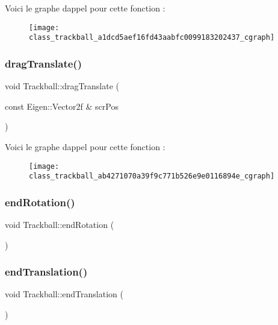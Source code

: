Voici le graphe d\textquotesingle{}appel pour cette fonction \+:\nopagebreak
\begin{figure}[H]
\begin{center}
\leavevmode
\texttt{[image: class\_trackball\_a1dcd5aef16fd43aabfc0099183202437\_cgraph]}
\end{center}
\end{figure}
\mbox{\label{class_trackball_ab4271070a39f9c771b526e9e0116894e}} 
\subsubsection{\texorpdfstring{drag\+Translate()}{dragTranslate()}}
{\footnotesize\ttfamily void Trackball\+::drag\+Translate (\begin{DoxyParamCaption}\item[{const Eigen\+::\+Vector2f \&}]{scr\+Pos }\end{DoxyParamCaption})}

Voici le graphe d\textquotesingle{}appel pour cette fonction \+:\nopagebreak
\begin{figure}[H]
\begin{center}
\leavevmode
\texttt{[image: class\_trackball\_ab4271070a39f9c771b526e9e0116894e\_cgraph]}
\end{center}
\end{figure}
\mbox{\label{class_trackball_a1d2f2f29955059d93bb64fe5f83b0afc}} 
\subsubsection{\texorpdfstring{end\+Rotation()}{endRotation()}}
{\footnotesize\ttfamily void Trackball\+::end\+Rotation (\begin{DoxyParamCaption}{ }\end{DoxyParamCaption})}

\mbox{\label{class_trackball_ae8ba33700d707ed2621f39bc8fbd3686}} 
\subsubsection{\texorpdfstring{end\+Translation()}{endTranslation()}}
{\footnotesize\ttfamily void Trackball\+::end\+Translation (\begin{DoxyParamCaption}{ }\end{DoxyParamCaption})}

